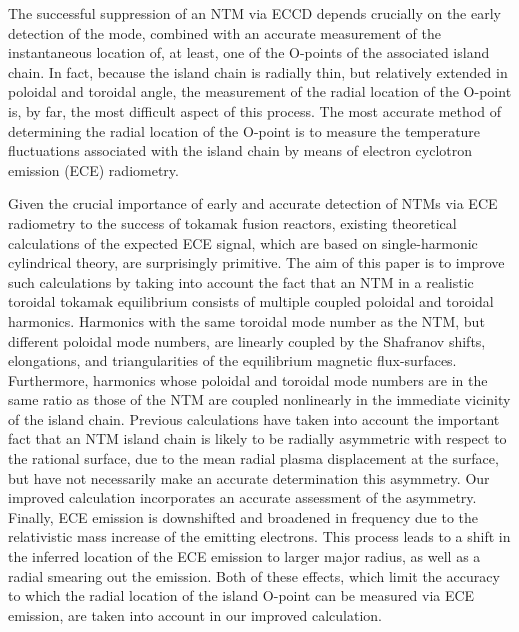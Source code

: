 \documentclass[12pt,prb,aps]{revtex4-1}
\begin{document}
The successful suppression of an NTM via ECCD depends crucially on the early detection of the mode, combined with an accurate measurement  of 
the instantaneous location of, at least, one of the O-points  of the associated island chain.\cite{eccd6} In fact, because the island chain is radially thin, 
but relatively extended in poloidal and toroidal angle, the measurement  of the radial location of the O-point is, by far,  the most difficult aspect of
this process. The most accurate method of determining the radial location of the O-point is to measure the temperature fluctuations associated with the island
chain by means of electron cyclotron emission (ECE) radiometry.\cite{ece1,ece2,ntm2,ece4}

Given the crucial importance of early and accurate detection of NTMs via ECE radiometry to the success of tokamak fusion reactors, existing theoretical calculations of
the expected ECE signal, which are based on single-harmonic cylindrical theory, are surprisingly primitive.\cite{eccd6,ece4,ece4a} The aim of this paper is to
improve such calculations by taking into account the fact that an NTM  in a realistic toroidal tokamak equilibrium consists of multiple coupled poloidal and toroidal harmonics. Harmonics with the same toroidal mode number as the NTM, but different poloidal mode numbers, are linearly coupled by the
Shafranov shifts, elongations, and triangularities of the equilibrium magnetic flux-surfaces.\cite{tear2,tear3,tear5} Furthermore, harmonics whose poloidal and
toroidal mode numbers are in the same ratio as those of the NTM are coupled nonlinearly in the immediate vicinity of the island chain.\cite{ntm1,ntm2}
Previous calculations have taken into account the important fact that an NTM island chain is likely to be radially asymmetric with respect to the rational surface,\cite{ece6} 
due to the mean radial plasma displacement at the  surface, but have not necessarily make an accurate
determination this asymmetry.\cite{eccd6} Our improved calculation incorporates an accurate assessment of the asymmetry. Finally, ECE emission
is downshifted and broadened in frequency due to the relativistic mass increase of the emitting electrons.\cite{ece1,ece2,ece5}  This process leads to a shift in the inferred location
of the ECE emission to larger major radius, as well as a radial smearing out the emission. Both of these effects, which limit the accuracy to which the
radial location of the island O-point can be measured via ECE emission,  are taken into account in our improved calculation.
\end{document}
